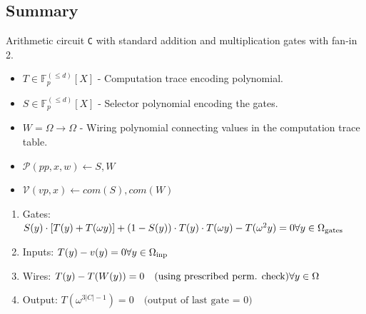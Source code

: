 \documentclass[../lecture-notes.tex]{subfiles}
\begin{document}
\subsection{Summary}
\begin{tcolorbox}[title=Plonk,
    colback=blue!5!white,
    colframe=blue!75!black,
    colbacktitle=blue!25!white,
    coltitle=blue!20!black,
    fonttitle=\bfseries,
    boxrule=1.25pt,
    subtitle style={boxrule=0pt,
    colback=blue!20!white,
    colupper=blue!75!gray}]

\small Arithmetic circuit \texttt{C} with standard addition and multiplication gates with fan-in 2.

\begin{itemize}[label=]
    \item \(T \in \mathbb{F}_p^{(\leq d)}[X]\) - Computation trace encoding polynomial.
    \item \(S \in \mathbb{F}_p^{(\leq d)}[X]\) - Selector polynomial encoding the gates.
    \item \(W = \Omega \to \Omega\) - Wiring polynomial connecting values in the computation trace table.
\end{itemize}

\begin{center}
\begin{itemize}[label=]
    \item \(\mathcal{P}(pp, x, w) \leftarrow S, W\)
    \item \(\mathcal{V}(vp, x) \leftarrow com(S), com(W)\)
\end{itemize}
\end{center}

\begin{enumerate}
    \item Gates: \( S(y)\cdot[T(y) + T(\omega y)] + (1-S(y))\cdot T(y)\cdot T(\omega y) - T(\omega^{2}y) = 0 \hfill \forall y \in \Omega_{\text{gates}} \)
    \item Inputs: \( T(y) - v(y) = 0 \hfill \forall y \in \Omega_{\text{inp}} \)
    \item Wires: \( T(y) - T(W(y)) = 0 \quad \text{(using prescribed perm. check)} \hfill \forall y \in \Omega \)
    \item Output: \( T(\omega^{3|C|-1}) = 0 \quad \text{(output of last gate = 0)} \)
\end{enumerate}

\end{tcolorbox}
\end{document}
